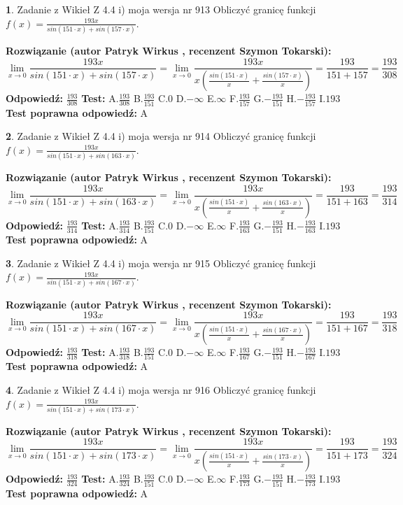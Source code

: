 \documentclass[12pt, a4paper]{article}
\theoremstyle{definition} %
\newtheorem{zad}{}
\newcommand{\zadStart}[1]{\begin{zad}#1\newline}
\newcommand{\zadStop}{\end{zad}}
\newcommand{\rozwStart}[2]{\noindent \textbf{Rozwiązanie (autor #1 , recenzent #2): }\newline}
\newcommand{\rozwStop}{\newline}
\newcommand{\odpStart}{\noindent \textbf{Odpowiedź:}\newline}
\newcommand{\odpStop}{\newline}
\newcommand{\testStart}{\noindent \textbf{Test:}\newline}
\newcommand{\testStop}{\newline}
\newcommand{\kluczStart}{\noindent \textbf{Test poprawna odpowiedź:}\newline}
\newcommand{\kluczStop}{\newline}
\begin{document}
\zadStart{Zadanie z Wikieł Z 4.4 i) moja wersja nr 913}
Obliczyć granicę funkcji $f(x)=\frac{193x}{sin(151\cdot x) +sin(157\cdot x)}$.
\zadStop
\rozwStart{Patryk Wirkus}{Szymon Tokarski}
$$\lim\limits_{x\to 0}\frac{193x}{sin(151\cdot x) +sin(157\cdot x)}=\lim\limits_{x\to 0}\frac{193x}{x(\frac{sin(151\cdot x)}{x}+\frac{sin(157\cdot x)}{x})}=\frac{193}{151+157} = \frac{193}{308}$$
\rozwStop
\odpStart
$\frac{193}{308}$
\odpStop
\testStart
A.$\frac{193}{308}$
B.$\frac{193}{151}$
C.$0$
D.$-\infty$
E.$\infty$
F.$\frac{193}{157}$
G.$-\frac{193}{151}$
H.$-\frac{193}{157}$
I.$193$
\testStop
\kluczStart
A
\kluczStop



\zadStart{Zadanie z Wikieł Z 4.4 i) moja wersja nr 914}
Obliczyć granicę funkcji $f(x)=\frac{193x}{sin(151\cdot x) +sin(163\cdot x)}$.
\zadStop
\rozwStart{Patryk Wirkus}{Szymon Tokarski}
$$\lim\limits_{x\to 0}\frac{193x}{sin(151\cdot x) +sin(163\cdot x)}=\lim\limits_{x\to 0}\frac{193x}{x(\frac{sin(151\cdot x)}{x}+\frac{sin(163\cdot x)}{x})}=\frac{193}{151+163} = \frac{193}{314}$$
\rozwStop
\odpStart
$\frac{193}{314}$
\odpStop
\testStart
A.$\frac{193}{314}$
B.$\frac{193}{151}$
C.$0$
D.$-\infty$
E.$\infty$
F.$\frac{193}{163}$
G.$-\frac{193}{151}$
H.$-\frac{193}{163}$
I.$193$
\testStop
\kluczStart
A
\kluczStop



\zadStart{Zadanie z Wikieł Z 4.4 i) moja wersja nr 915}
Obliczyć granicę funkcji $f(x)=\frac{193x}{sin(151\cdot x) +sin(167\cdot x)}$.
\zadStop
\rozwStart{Patryk Wirkus}{Szymon Tokarski}
$$\lim\limits_{x\to 0}\frac{193x}{sin(151\cdot x) +sin(167\cdot x)}=\lim\limits_{x\to 0}\frac{193x}{x(\frac{sin(151\cdot x)}{x}+\frac{sin(167\cdot x)}{x})}=\frac{193}{151+167} = \frac{193}{318}$$
\rozwStop
\odpStart
$\frac{193}{318}$
\odpStop
\testStart
A.$\frac{193}{318}$
B.$\frac{193}{151}$
C.$0$
D.$-\infty$
E.$\infty$
F.$\frac{193}{167}$
G.$-\frac{193}{151}$
H.$-\frac{193}{167}$
I.$193$
\testStop
\kluczStart
A
\kluczStop



\zadStart{Zadanie z Wikieł Z 4.4 i) moja wersja nr 916}
Obliczyć granicę funkcji $f(x)=\frac{193x}{sin(151\cdot x) +sin(173\cdot x)}$.
\zadStop
\rozwStart{Patryk Wirkus}{Szymon Tokarski}
$$\lim\limits_{x\to 0}\frac{193x}{sin(151\cdot x) +sin(173\cdot x)}=\lim\limits_{x\to 0}\frac{193x}{x(\frac{sin(151\cdot x)}{x}+\frac{sin(173\cdot x)}{x})}=\frac{193}{151+173} = \frac{193}{324}$$
\rozwStop
\odpStart
$\frac{193}{324}$
\odpStop
\testStart
A.$\frac{193}{324}$
B.$\frac{193}{151}$
C.$0$
D.$-\infty$
E.$\infty$
F.$\frac{193}{173}$
G.$-\frac{193}{151}$
H.$-\frac{193}{173}$
I.$193$
\testStop
\kluczStart
A
\kluczStop
\end{document}
